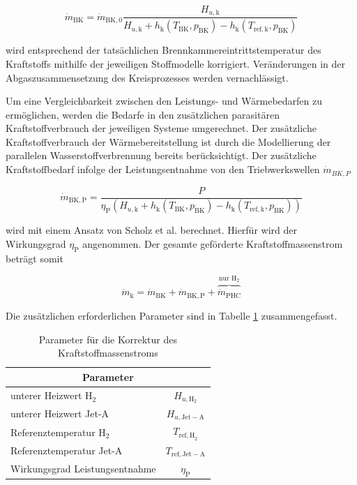 \begin{equation}\label{Eq:tempcorr}
	\dot{m}_{\mathrm{BK}}=\dot{m}_{\mathrm{BK},0}\frac{H_{u,\mathrm{k}}}{H_{u,\mathrm{k}}+h_\mathrm{k}(T_{\mathrm{BK}}, p_{\mathrm{BK}})-h_\mathrm{k}(T_{\mathrm{ref,k}}, p_{\mathrm{BK}})}
\end{equation}

wird entsprechend der tatsächlichen Brennkammereintrittstemperatur des Kraftstoffs mithilfe der jeweiligen Stoffmodelle korrigiert. Veränderungen in der Abgaszusammensetzung des Kreisprozesses werden vernachlässigt.

Um eine Vergleichbarkeit zwischen den Leistungs- und Wärmebedarfen zu ermöglichen, werden die Bedarfe in den zusätzlichen parasitären Kraftstoffverbrauch der jeweiligen Systeme umgerechnet. Der zusätzliche Kraftstoffverbrauch der Wärmebereitstellung ist durch die Modellierung der parallelen Wasserstoffverbrennung bereits berücksichtigt. Der zusätzliche Kraftstoffbedarf infolge der Leistungsentnahme von den Triebwerkswellen $\dot{m}_{BK,P}$

\begin{equation}\label{Eq:powerofftake}
	\dot{m}_{\mathrm{BK,P}}=\frac{P}{\eta_\mathrm{P}\left(H_{u,\mathrm{k}}+h_\mathrm{k}(T_{\mathrm{BK}}, p_{\mathrm{BK}})-h_\mathrm{k}(T_{\mathrm{ref,k}}, p_{\mathrm{BK}})\right)}
\end{equation}

 wird mit einem Ansatz von Scholz et al. \cite{Scholz.2013} berechnet. Hierfür wird der Wirkungsgrad $\eta_\mathrm{P}$ angenommen. Der gesamte geförderte Kraftstoffmassenstrom beträgt somit
 
 \begin{equation}\label{Eq:sum}
	\dot{m}_{\mathrm{k}}=\dot{m}_{\mathrm{BK}}+\dot{m}_{\mathrm{BK,P}}+\overbrace{\dot{m}_{\mathrm{PHC}}}^{\text{nur H}_2}
\end{equation}
 
 Die zusätzlichen erforderlichen Parameter sind in Tabelle \ref{Tab:fuel_corr_params} zusammengefasst.

 \begin{table}[ht]
    \centering
	\caption{Parameter für die Korrektur des Kraftstoffmassenstroms}
	\begin{tabular} {|l|c|} \hline%
    \multicolumn{2}{|c|}{Parameter} \\ \hline\hline
    unterer Heizwert H$_2$ & $H_{u,\mathrm{H}_2}$ \\ \hline
    unterer Heizwert Jet-A & $H_{u,\mathrm{Jet-A}}$ \\ \hline
    Referenztemperatur H$_2$ & $T_{\mathrm{ref, H}_2}$ \\ \hline
    Referenztemperatur Jet-A & $T_{\mathrm{ref, Jet-A}}$ \\ \hline
    Wirkungsgrad Leistungsentnahme & $\eta_\mathrm{P}$ \\ \hline    
	\end{tabular}	
    \label{Tab:fuel_corr_params}%
\end{table}
\FloatBarrier 

